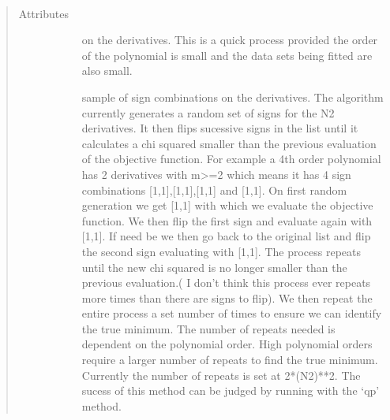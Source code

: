 \documentclass[letterpaper,10pt,english]{sphinxmanual}
\begin{document}
\begin{fulllineitems}
\label{\detokenize{source/maxsmooth:maxsmooth.settings.setting}}~\begin{quote}\begin{description}
\item[{Attributes}] \leavevmode\begin{description}
\item[{}] \leavevmode
\item[{}] \leavevmode
\item[{}] \leavevmode
\item[{}] \leavevmode
\item[{}] \leavevmode
on the derivatives. This is a quick process provided the
order of the polynomial is small and the data
sets being fitted are also small.

\item[{}] \leavevmode
sample of sign combinations on the derivatives. The
algorithm currently generates a random set of signs for
the N\sphinxhyphen{}2 derivatives. It then flips sucessive signs in the
list until it calculates a chi squared smaller than the
previous evaluation of the objective function. For
example a 4th order polynomial has 2 derivatives with m\textgreater{}=2
which means it has 4 sign combinations {[}1,1{]},{[}\sphinxhyphen{}1,\sphinxhyphen{}1{]},{[}\sphinxhyphen{}1,1{]}
and {[}1,\sphinxhyphen{}1{]}. On first random generation we get {[}\sphinxhyphen{}1,1{]} with
which we evaluate the objective function. We then flip the
first sign and evaluate again with {[}1,1{]}. If need be we
then go back to the original list and flip the second sign
evaluating with {[}\sphinxhyphen{}1,\sphinxhyphen{}1{]}. The process repeats until the new
chi squared is no longer smaller than the previous
evaluation.( I don’t think this process ever repeats more
times than there are signs to flip). We then repeat the
entire process a set number of times to ensure we can
identify the true minimum. The number of repeats needed
is dependent on the polynomial order. High polynomial
orders require a larger number of repeats to find the true
minimum. Currently the number of repeats is set at
2*(N\sphinxhyphen{}2)**2. The sucess of this method can be judged by
running with the ‘qp’ method.


\end{description}
\end{description}
\end{quote}
\end{fulllineitems}
\end{document}
